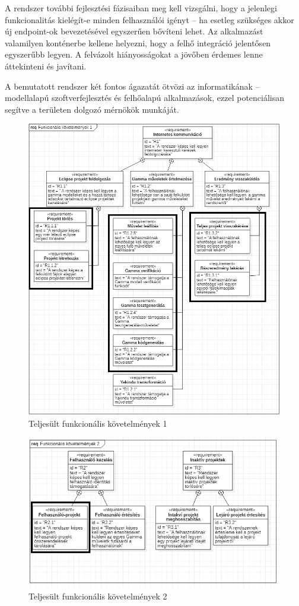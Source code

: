 A rendszer további fejlesztési fázisaiban meg kell vizsgálni, hogy a jelenlegi funkcionalitás kielégít-e minden felhasználói igényt -- ha esetleg szükséges akkor új endpoint-ok bevezetésével egyszerűen bővíteni lehet. Az alkalmazást valamilyen konténerbe kellene helyezni, hogy a felhő integráció jelentősen egyszerűbb legyen. A felvázolt hiányosságokat a jövőben érdemes lenne áttekinteni és javítani.

A bemutatott rendszer két fontos ágazatát ötvözi az informatikának -- modellalapú szoftverfejlesztés és felhőalapú alkalmazások, ezzel potenciálisan segítve a területen dolgozó mérnökök munkáját.
\begin{figure}[t]
	\includegraphics[width=\textwidth, keepaspectratio]{figures/requierments_placeholder_done.PNG}
	\caption{Teljesült funkcionális követelmények 1}
	\label{fig:requierments_placeholder_done}
\end{figure}
\begin{figure}[t]
	\includegraphics[width=\textwidth, keepaspectratio]{figures/requierments_2_done.PNG}
	\caption{Teljesült funkcionális követelmények 2}
	\label{fig:requierments_2_done}
\end{figure}
